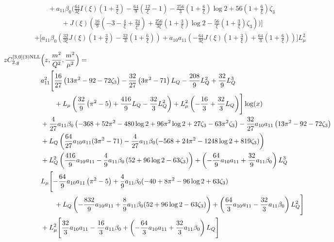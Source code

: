 \documentclass[a4paper]{article}
\begin{document}
\begin{equation}
\begin{split}
		&\qquad + a_{11} \beta_0 \Biggl(\frac{64}{3\xi} I(\xi) \left(1 + \frac{3}{\xi}\right) - \frac{64}{9} \left(\frac{12}{\xi} - 1\right) - \frac{256}{3} \left(1 + \frac{6}{\xi}\right) \log 2 + 56 \left(1 + \frac{6}{\xi}\right) \zeta_3 \\
		& \qquad \qquad + J(\xi) \left( \frac{16}{9} \left(-3 - \frac{4}{\xi} + \frac{24}{\xi^2}\right) + \frac{256}{3\xi} \left(1 + \frac{3}{\xi}\right) \log 2 - \frac{56}{\xi}\left(1 + \frac{3}{\xi}\right) \zeta_3 \right)\Biggr)\Biggr] \\
		& + \Biggl[a_{11} \beta_0 \left( \frac{32}{3\xi} J(\xi) \left(1 + \frac{3}{\xi}\right) - \frac{32}{3} \left(1 + \frac{6}{\xi}\right) \right)  + a_{10} a_{11} \left(-\frac{64}{3\xi} J(\xi) \left(1 + \frac{3}{\xi}\right) + \frac{64}{3} \left(1 + \frac{6}{\xi}\right)\right)\Biggr] L_\mu^2
	\end{split}
\end{equation}

\begin{equation}
	\begin{split}
		z C_{2,g}^{[3, 0](3) \rm NLL}&\Bigl(z,\frac{m^2}{Q^2},\frac{m^2}{\mu^2}\Bigr)= \\
		& a_{11}^2 \Biggl[\frac{16}{27} \left(13 \pi^2 -92- 72 \zeta_3\right) -\frac{32}{27} \left(3 \pi^2 - 71\right) L_Q - \frac{208}{9} L_Q^2 + \frac{32}{9} L_Q^3  \\
		& \qquad + L_\mu \left(\frac{32}{9} \left( \pi^2 - 5\right) + \frac{416}{9} L_Q - \frac{32}{3} L_Q^2 \right) + L_\mu^2 \left(-\frac{16}{3} + \frac{32}{3} L_Q\right)\Biggr] \log(x) \\
		& + \frac{4}{27} a_{11} \beta_0 \left(-368 + 52 \pi^2 - 480 \log 2 + 96 \pi^2 \log 2 + 27 \zeta_3 - 63 \pi^2 \zeta_3\right) - \frac{32}{27} a_{10} a_{11} \left(13 \pi^2 -92- 72 \zeta_3\right) \\
		& + L_Q \left( \frac{64}{27} a_{10} a_{11} (3 \pi^2 - 71) - \frac{4}{27} a_{11} \beta_0 (-568 + 24 \pi^2 - 1248 \log 2 + 819 \zeta_3) \right) \\
		& + L_Q^2 \left(\frac{416}{9} a_{10} a_{11} - \frac{4}{9} a_{11} \beta_0 \left(52 + 96 \log 2 - 63 \zeta_3 \right)\right) + \left(- \frac{64}{9} a_{10} a_{11} + \frac{32}{9} a_{11} \beta_0 \right) L_Q^3 \\
		& L_\mu \Biggl[-\frac{64}{9} a_{10} a_{11} \left( \pi^2 - 5\right) + \frac{4}{9} a_{11} \beta_0 (-40 + 8 \pi^2 - 96 \log 2 + 63 \zeta_3) \\
		& \qquad + L_Q \left(-\frac{832}{9} a_{10} a_{11} + \frac{8}{9} a_{11} \beta_0 (52 + 96 \log 2 - 63 \zeta_3)\right) + \left(\frac{64}{3} a_{10} a_{11} - \frac{32}{3} a_{11} \beta_0 \right) L_Q^2 \Biggr] \\
		& + L_\mu^2 \Biggl[\frac{32}{3} a_{10} a_{11} - \frac{16}{3} a_{11} \beta_0 + \left(-\frac{64}{3} a_{10} a_{11} + \frac{32}{3} a_{11} \beta_0 \right) L_Q \Biggr]
	\end{split}
\end{equation}
\end{document}
